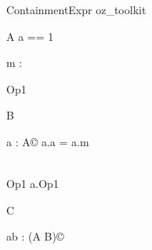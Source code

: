 \begin{zsection}
  \SECTION ContainmentExpr \parents oz\_toolkit
\end{zsection}

\begin{class}{A}
  a == 1\\
  \begin{state}
    m : \nat
  \end{state}
  Op1 \sdef [x? : \nat]
\end{class}


\begin{class}{B}
  \begin{state}
   a : A\copyright
  \where
    a.a = a.m
  \end{state}\\
  Op1 \sdef a.Op1
\end{class}

\begin{class}{C}
  \begin{state}
    ab : (A \classuni B)\copyright
  \end{state}
\end{class}
